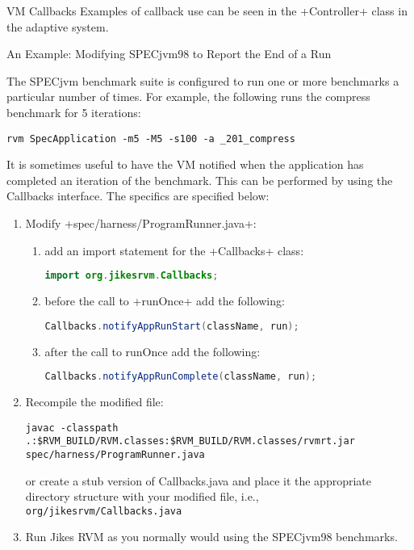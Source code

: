 \begin{section}{VM Callbacks}
Examples of callback use can be seen in the \spverb+Controller+ class in the adaptive system.

\begin{subsection}{An Example: Modifying SPECjvm98 to Report the End of a Run}

The SPECjvm benchmark suite is configured to run one or more benchmarks a particular number of times. For example, the following runs the compress benchmark for 5 iterations:
\begin{lstlisting}
rvm SpecApplication -m5 -M5 -s100 -a _201_compress
\end{lstlisting}

It is sometimes useful to have the VM notified when the application has completed an iteration of the benchmark. This can be performed by using the Callbacks interface. The specifics are specified below:
\begin{enumerate}
  \item Modify \spverb+spec/harness/ProgramRunner.java+:
    \begin{enumerate}
      \item add an import statement for the \spverb+Callbacks+ class:
        \begin{lstlisting}[language=Java]
import org.jikesrvm.Callbacks;
        \end{lstlisting}
      \item before the call to \spverb+runOnce+ add the following:
        \begin{lstlisting}[language=Java]
Callbacks.notifyAppRunStart(className, run);
        \end{lstlisting}
      \item after the call to runOnce add the following:
        \begin{lstlisting}[language=Java]
Callbacks.notifyAppRunComplete(className, run);
        \end{lstlisting}
    \end{enumerate}
  \item Recompile the modified file:
    \begin{lstlisting}
javac -classpath .:$RVM_BUILD/RVM.classes:$RVM_BUILD/RVM.classes/rvmrt.jar spec/harness/ProgramRunner.java
    \end{lstlisting}
    or create a stub version of Callbacks.java and place it the appropriate directory structure with your modified file, i.e., \newline \texttt{org/jikes\-rvm/Call\-backs.java}
  \item  Run Jikes RVM as you normally would using the SPECjvm98 benchmarks.
\end{enumerate}


\end{subsection}
\end{section}
